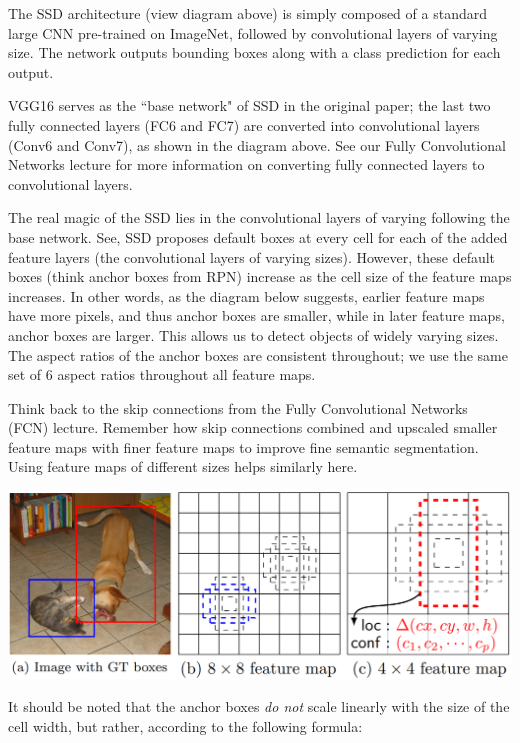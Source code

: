 \documentclass{article}
\begin{document}
The SSD architecture (view diagram above) is simply composed of a standard large CNN pre-trained on ImageNet, followed by convolutional layers of varying size. The network outputs bounding boxes along with a class prediction for each output.

VGG16 serves as the ``base network" of SSD in the original paper; the last two fully connected layers (FC6 and FC7) are converted into convolutional layers (Conv6 and Conv7), as shown in the diagram above. See our Fully Convolutional Networks lecture for more information on converting fully connected layers to convolutional layers.

The real magic of the SSD lies in the convolutional layers of varying following the base network. See, SSD proposes default boxes at every cell for each of the added feature layers (the convolutional layers of varying sizes). However, these default boxes (think anchor boxes from RPN) increase as the cell size of the feature maps increases. In other words, as the diagram below suggests, earlier feature maps have more pixels, and thus anchor boxes are smaller, while in later feature maps, anchor boxes are larger. This allows us to detect objects of widely varying sizes. The aspect ratios of the anchor boxes are consistent throughout; we use the same set of 6 aspect ratios throughout all feature maps.

Think back to the skip connections from the Fully Convolutional Networks (FCN) lecture. Remember how skip connections combined and upscaled smaller feature maps with finer feature maps to improve fine semantic segmentation. Using feature maps of different sizes helps similarly here.

\begin{center}
\includegraphics[scale=0.42]{ssdmaps.PNG}
\end{center}

It should be noted that the anchor boxes \textit{do not} scale linearly with the size of the cell width, but rather, according to the following formula:
\end{document}
